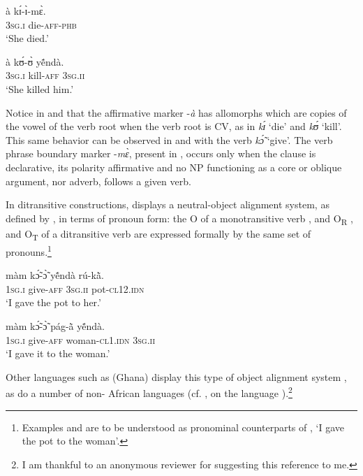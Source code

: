 \documentclass[output=paper]{langsci/langscibook}
\begin{document}
\ea
\label{ex:10.pacchiarotti}
\gll à    kɪ́-ɪ̀-mɛ̀.      \\     
\textsc{3sg.i} die-\textsc{aff-phb} \\
\glt`She died.'
\z 

\ea
\label{ex:11.pacchiarotti}
\gll à    kʊ́-ʊ̀    yẽ́ndà.\\
\textsc{3sg.i}    kill-\textsc{aff}  \textsc{3sg.ii}\\
\glt`She killed him.'
\z

Notice in  and  that the affirmative marker -\textit{à} has allomorphs which are copies of the vowel of the verb root when the verb root is CV, as in \textit{kɪ́} `die' and \textit{kʊ́} `kill'. This same behavior can be observed in  and  with the verb \textit{k\'{\~{ɔ}}} `give'. The verb phrase boundary marker -\textit{mɛ̀}, present in , occurs only when the clause is declarative, its polarity affirmative and no NP functioning as a core or oblique argument, nor adverb, follows a given verb.  

In ditransitive constructions,  displays a neutral-object alignment system, as defined by \citet{malchukovetal2010}, in terms of pronoun form: the O of a monotransitive verb , and O\textsubscript{R} , and O\textsubscript{T}  of a ditransitive verb are expressed formally by the same set of pronouns.\footnote{Examples  and  are to be understood as pronominal counterparts of , `I gave the pot to the woman'.} 

\ea
\label{ex:12.pacchiarotti}
\gll màm    kɔ̃́-ɔ̃̀      y\'{ẽ}ndà    rú-k\`{ã}.\\
\textsc{1sg.i}    give-\textsc{aff}    \textsc{3sg.ii}    pot\textsc{-cl12.idn} \\
\glt `I gave the pot to her.'
\z

\ea
\label{ex:13.pacchiarotti}
\gll màm    kɔ̃́-ɔ̃̀    pág-\`{ã}      y\'{ẽ}ndà.\\
\textsc{1sg.i}    give-\textsc{aff}  woman-\textsc{cl1.idn}  \textsc{3sg.ii} \\
\glt `I gave it to the woman.'
\z

Other  languages such as  (Ghana) display this type of object alignment system \citep{bodomo1997}, as do a number of non- African languages (cf. \citealt{ackermanetaltoappear}, on the  language ).\footnote{I am thankful to an anonymous reviewer for suggesting this reference to me.}
\end{document}
